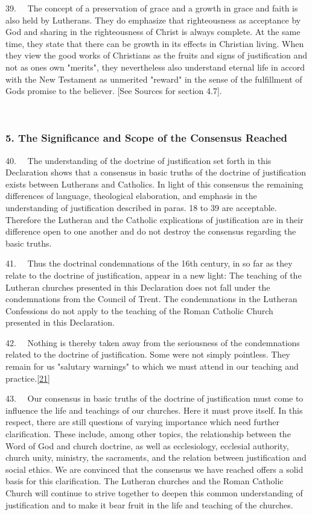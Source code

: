 39.~ ~The concept of a preservation of grace and a growth in grace and
faith is also held by Lutherans. They do emphasize that righteousness as
acceptance by God and sharing in the righteousness of Christ is always
complete. At the same time, they state that there can be growth in its
effects in Christian living. When they view the good works of Christians
as the fruits and signs of justification and not as
one\textquotesingle s own "merits", they nevertheless also understand
eternal life in accord with the New Testament as unmerited "reward" in
the sense of the fulfillment of God\textquotesingle s promise to the
believer. {[}See Sources for section 4.7{]}.

~

\subsubsection{5. The Significance and Scope of the Consensus
Reached}\label{the-significance-and-scope-of-the-consensus-reached}

40.~ ~The understanding of the doctrine of justification set forth in
this Declaration shows that a consensus in basic truths of the doctrine
of justification exists between Lutherans and Catholics. In light of
this consensus the remaining differences of language, theological
elaboration, and emphasis in the understanding of justification
described in paras. 18 to 39 are acceptable. Therefore the Lutheran and
the Catholic explications of justification are in their difference open
to one another and do not destroy the consensus regarding the basic
truths.

41.~ ~Thus the doctrinal condemnations of the 16th century, in so far as
they relate to the doctrine of justification, appear in a new light: The
teaching of the Lutheran churches presented in this Declaration does not
fall under the condemnations from the Council of Trent. The
condemnations in the Lutheran Confessions do not apply to the teaching
of the Roman Catholic Church presented in this Declaration.

42.~ ~Nothing is thereby taken away from the seriousness of the
condemnations related to the doctrine of justification. Some were not
simply pointless. They remain for us "salutary warnings" to which we
must attend in our teaching and
practice.\label{r21}{}\hyperref[21]{{[}21{]}}

43.~ ~Our consensus in basic truths of the doctrine of justification
must come to influence the life and teachings of our churches. Here it
must prove itself. In this respect, there are still questions of varying
importance which need further clarification. These include, among other
topics, the relationship between the Word of God and church doctrine, as
well as ecclesiology, ecclesial authority, church unity, ministry, the
sacraments, and the relation between justification and social ethics. We
are convinced that the consensus we have reached offers a solid basis
for this clarification. The Lutheran churches and the Roman Catholic
Church will continue to strive together to deepen this common
understanding of justification and to make it bear fruit in the life and
teaching of the churches.

